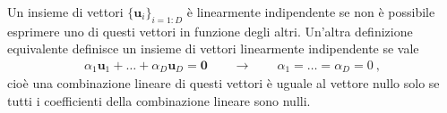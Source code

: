 \documentclass[letterpaper,10pt,italian]{jupyterBook}
\begin{document}
\sphinxAtStartPar
{} Un insieme di vettori \(\{ \mathbf{u}_i \}_{i=1:D}\) è linearmente indipendente se non è possibile esprimere uno di questi vettori in funzione degli altri. Un’altra definizione equivalente definisce un insieme di vettori linearmente indipendente se vale
\begin{equation*}
\begin{split}\alpha_1 \mathbf{u}_1 + \dots + \alpha_D \mathbf{u}_D = \mathbf{0} \qquad \rightarrow \qquad \alpha_1 = \dots = \alpha_D = 0 \ ,\end{split}
\end{equation*}
\sphinxAtStartPar
cioè una combinazione lineare di questi vettori è uguale al vettore nullo solo se tutti i coefficienti della combinazione lineare sono nulli.
\end{document}
